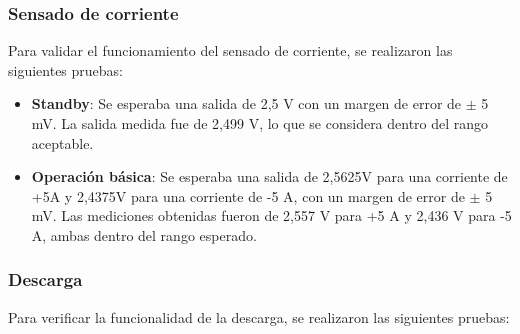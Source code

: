 \subsubsection{Sensado de corriente}

Para validar el funcionamiento del sensado de corriente, se realizaron las siguientes pruebas:

\begin{itemize}
	\item \textbf{Standby}: Se esperaba una salida de 2,5 V con un margen de error de $\pm$ 5 mV. La salida medida fue de 2,499 V, lo que se considera dentro del rango aceptable.
	
	\item \textbf{Operación básica}: Se esperaba una salida de 2,5625V para una corriente de +5A y 2,4375V para una corriente de -5 A, con un margen de error de $\pm$ 5 mV. Las mediciones obtenidas fueron de 2,557 V para +5 A y 2,436 V para -5 A, ambas dentro del rango esperado.
\end{itemize}	


\subsubsection{Descarga}

Para verificar la funcionalidad de la descarga, se realizaron las siguientes pruebas:

